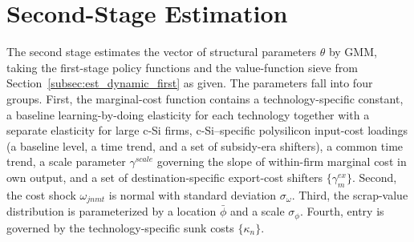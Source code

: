 \documentclass[12pt]{article}
\begin{document}




 
\section{Second-Stage Estimation}
\label{appendix:second_stage}
 
The second stage estimates the vector of structural parameters $\theta$ by GMM, taking the first-stage policy functions and the value-function sieve from Section~\ref{subsec:est_dynamic_first} as given. The parameters fall into four groups. First, the marginal-cost function contains a technology-specific constant, a baseline learning-by-doing elasticity for each technology together with a separate elasticity for large c-Si firms, c-Si--specific polysilicon input-cost loadings (a baseline level, a time trend, and a set of subsidy-era shifters), a common time trend, a scale parameter $\gamma^{scale}$ governing the slope of within-firm marginal cost in own output, and a set of destination-specific export-cost shifters $\{\gamma^{ex}_m\}$. Second, the cost shock $\omega_{jnmt}$ is normal with standard deviation $\sigma_\omega$. Third, the scrap-value distribution is parameterized by a location $\bar\phi$ and a scale $\sigma_\phi$. Fourth, entry is governed by the technology-specific sunk costs $\{\kappa_n\}$.
 
\end{document}

